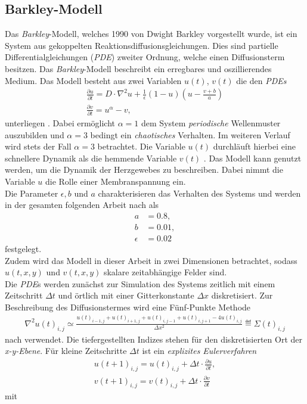 \subsection{Barkley-Modell}
Das \textit{Barkley}-Modell, welches 1990 von Dwight Barkley vorgestellt wurde, ist ein System aus gekoppelten Reaktionsdiffusionsgleichungen. Dies sind partielle Differentialgleichungen (\textit{PDE}) zweiter Ordnung, welche einen Diffusionsterm besitzen. Das \textit{Barkley}-Modell beschreibt ein erregbares und oszillierendes Medium. Das Modell besteht aus zwei Variablen $u(t)$, $v(t)$ die den  \textit{PDEs}
\begin{equation}
\begin{gathered}
\frac{\partial u}{\partial t} = D \cdot \nabla^2 u + \frac{1}{\epsilon} (1-u) \left(u-\frac{v+b}{a}\right)\\
\frac{\partial v}{\partial t} = u^\alpha-v,
\end{gathered}
\end{equation}
unterliegen \citep{Barkley:2008}. Dabei ermöglicht $\alpha=1$ dem System \textit{periodische} Wellenmuster auszubilden und $\alpha=3$ bedingt ein \textit{chaotisches} Verhalten. Im weiteren Verlauf wird stets der Fall $\alpha=3$ betrachtet. Die Variable $u(t)$ durchläuft hierbei eine schnellere Dynamik als die hemmende Variable $v(t)$ \citep{Barkley:2008, berg2011synchronization}. Das Modell kann genutzt werden, um die Dynamik der Herzgewebes zu beschreiben. Dabei nimmt die Variable $u$ die Rolle einer Membranspannung ein.\\
Die Parameter $\epsilon, b$ und $a$ charakterisieren das Verhalten des Systems und werden in der gesamten folgenden Arbeit nach \citep{Barkley:2008} als
\begin{align*}
a &= 0.8,\\ b &= 0.01,\\ \epsilon &= 0.02
\end{align*}
festgelegt.\\
Zudem wird das Modell in dieser Arbeit in zwei Dimensionen betrachtet, sodass $u(t, x,y)$ und $v(t, x,y)$ skalare zeitabhängige Felder sind.\\
Die \textit{PDE}s werden zunächst zur Simulation des Systems zeitlich mit einem Zeitschritt $\Delta t$ und örtlich mit einer Gitterkonstante $\Delta x$ diskretisiert. Zur Beschreibung des Diffusionstermes wird eine Fünf-Punkte Methode
\begin{align}
\nabla^2 u(t)_{i,j} \simeq \frac{u(t)_{i-1, j} + u(t)_{i+1,j} + u(t)_{i,j-1} + u(t)_{i,j+1} - 4 u(t)_{i,j}}{\Delta x^2} \eqdef \Sigma(t)_{i,j}
\end{align} 
nach \citep{Barkley:2008} verwendet. Die tiefergestellten Indizes stehen für den diskretisierten Ort der \textit{x-y-Ebene}.
Für kleine Zeitschritte $\Delta t$ ist ein \textit{explizites Eulerverfahren}
\begin{equation}
\begin{gathered}
u(t+1)_{i,j} = u(t)_{i,j} + \Delta t \cdot \frac{\partial u}{\partial t},\\
v(t+1)_{i,j} = v(t)_{i,j} + \Delta t \cdot \frac{\partial v}{\partial t}
\end{gathered}
\end{equation}
mit

